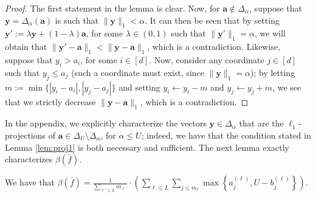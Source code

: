 \begin{proof}
	The first statement in the lemma is clear. Now, for $\mathbf{a}\notin \Delta_\alpha$, suppose that $\mathbf{y} = \Delta_\alpha(\mathbf{a})$ is such that $\lVert \mathbf{y}\rVert_1 < \alpha$. It can then be seen that by setting $\mathbf{y}':= \lambda\mathbf{y}+(1-\lambda)\mathbf{a}$, for some $\lambda\in (0,1)$ such that $\lVert \mathbf{y}'\rVert_1 = \alpha$, we will obtain that $\lVert \mathbf{y}'-\mathbf{a}\rVert_1 < \lVert \mathbf{y}-\mathbf{a}\rVert_1$, which is a contradiction. Likewise, suppose that $y_i>a_i$, for some $i\in [d]$. Now, consider any coordinate $j\in [d]$ such that $y_j\leq a_j$ (such a coordinate must exist, since $\lVert \mathbf{y}\rVert_1 = \alpha$); by letting $m:= \min\{|y_i-a_i|,|y_j-a_j|\}$ and setting $y_i \gets y_i-m$ and $y_j \gets y_j+m$, we see that we strictly decrease $\lVert \mathbf{y}-\mathbf{a}\rVert_1$, which is a contradiction.
\end{proof}
In the appendix, we explicitly characterize the vectors $\mathbf{y}\in \Delta_\alpha$ that are the $\ell_1$-projections of $\mathbf{a}\in \Delta_U\setminus \Delta_\alpha$, for $\alpha\leq U$; indeed, we have that the condition stated in Lemma \ref{lem:proj1} is both necessary and sufficient. The next lemma exactly characterizes $\beta(\overline{f})$.
\begin{lemma}
	\label{lem:proj2}
	We have that $\beta(\overline{f}) = \frac{1}{\sum_{\ell'\leq L} m_{\ell'}}\cdot \left(\sum_{\ell\leq L}\sum_{j\leq m_\ell} \max\left\{a_j^{(\ell)},U-b_j^{(\ell)}\right\}\right)$.
\end{lemma}
